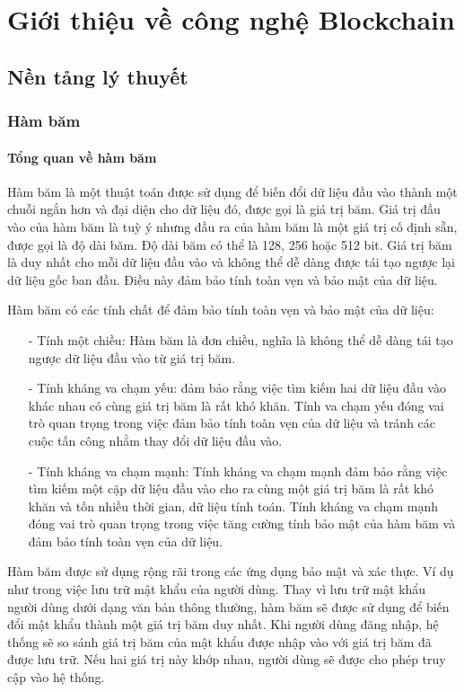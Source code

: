 \chapter{Giới thiệu về công nghệ Blockchain}
\section{Nền tảng lý thuyết}
\subsection{Hàm băm}
\subsubsection{Tổng quan về hàm băm}
Hàm băm là một thuật toán được sử dụng để biến đổi dữ liệu đầu vào thành một chuỗi ngắn hơn và đại diện
cho dữ liệu đó, được gọi là giá trị băm. Giá trị đầu vào của hàm băm là tuỳ ý nhưng đầu ra của hàm băm là một giá trị 
cố định sẵn, được gọi là độ dài băm. Độ dài băm có thể là 128, 256 hoặc 512 bit.
Giá trị băm là duy nhất cho mỗi dữ liệu đầu vào và không thể dễ dàng được tái tạo ngược lại dữ liệu gốc ban đầu. Điều này đảm bảo tính toàn vẹn và 
bảo mật của dữ liệu.

Hàm băm có các tính chất để đảm bảo tính toàn vẹn và bảo mật của dữ liệu:
\begin{itemize}
\item[-] Tính một chiều: Hàm băm là đơn chiều, nghĩa là không thể dễ dàng 
tái tạo ngược dữ liệu đầu vào từ giá trị băm.
\item[-] Tính kháng va chạm yếu: đảm bảo rằng việc tìm kiếm hai dữ liệu đầu vào khác nhau có cùng 
giá trị băm là rất khó khăn. Tính va chạm yếu đóng vai trò quan trọng trong việc đảm bảo tính toàn
vẹn của dữ liệu và tránh các cuộc tấn công nhằm thay đổi dữ liệu đầu vào. 
\item[-] Tính kháng va chạm mạnh:  Tính kháng va chạm mạnh đảm bảo rằng việc tìm kiếm một cặp dữ 
liệu đầu vào cho ra cùng một giá trị băm là rất khó khăn và tốn nhiều thời gian, dữ liệu tính toán.
Tính kháng va chạm mạnh đóng vai trò quan trọng trong việc tăng cường tính bảo mật của hàm băm và 
đảm bảo tính toàn vẹn của dữ liệu.
\item[] 
\end{itemize}

Hàm băm được sử dụng rộng rãi trong các ứng dụng bảo mật và xác thực. Ví dụ như trong việc lưu trữ
mật khẩu của người dùng. Thay vì lưu trữ mật khẩu người dùng dưới dạng văn bản thông thường, hàm 
băm sẽ được sử dụng để biến đổi mật khẩu thành một giá trị băm duy nhất. Khi người dùng đăng nhập, 
hệ thống sẽ so sánh giá trị băm của mật khẩu được nhập vào với giá trị băm đã được lưu trữ. Nếu hai 
giá trị này khớp nhau, người dùng sẽ được cho phép truy cập vào hệ thống.

